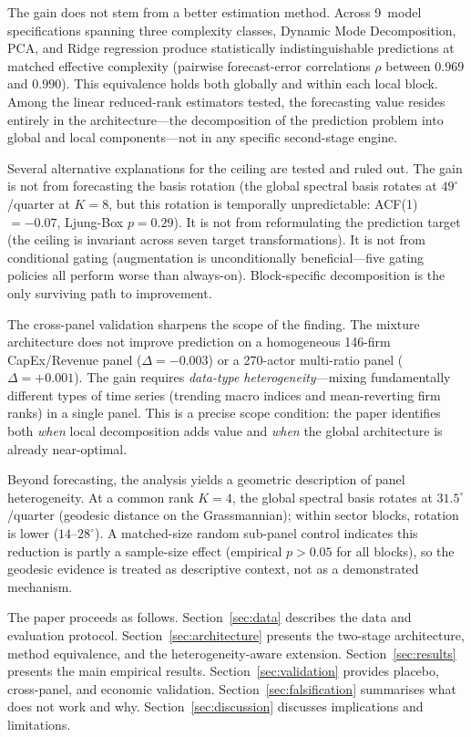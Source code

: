 \documentclass[11pt,a4paper]{article}
\begin{document}
The gain does not stem from a better estimation method. Across 9~model specifications spanning three complexity classes, Dynamic Mode Decomposition, PCA, and Ridge regression produce statistically indistinguishable predictions at matched effective complexity (pairwise forecast-error correlations $\rho$ between $0.969$ and $0.990$). This equivalence holds both globally and within each local block. Among the linear reduced-rank estimators tested, the forecasting value resides entirely in the architecture---the decomposition of the prediction problem into global and local components---not in any specific second-stage engine.

Several alternative explanations for the ceiling are tested and ruled out. The gain is not from forecasting the basis rotation (the global spectral basis rotates at $49^\circ$/quarter at $K{=}8$, but this rotation is temporally unpredictable: ACF(1) $= -0.07$, Ljung-Box $p = 0.29$). It is not from reformulating the prediction target (the ceiling is invariant across seven target transformations). It is not from conditional gating (augmentation is unconditionally beneficial---five gating policies all perform worse than always-on). Block-specific decomposition is the only surviving path to improvement.

The cross-panel validation sharpens the scope of the finding. The mixture architecture does not improve prediction on a homogeneous 146-firm CapEx/Revenue panel ($\Delta = -0.003$) or a 270-actor multi-ratio panel ($\Delta = +0.001$). The gain requires \emph{data-type heterogeneity}---mixing fundamentally different types of time series (trending macro indices and mean-reverting firm ranks) in a single panel. This is a precise scope condition: the paper identifies both \emph{when} local decomposition adds value and \emph{when} the global architecture is already near-optimal.

Beyond forecasting, the analysis yields a geometric description of panel heterogeneity. At a common rank $K{=}4$, the global spectral basis rotates at $31.5^\circ$/quarter (geodesic distance on the Grassmannian); within sector blocks, rotation is lower ($14$--$28^\circ$). A matched-size random sub-panel control indicates this reduction is partly a sample-size effect (empirical $p > 0.05$ for all blocks), so the geodesic evidence is treated as descriptive context, not as a demonstrated mechanism.

The paper proceeds as follows. Section~\ref{sec:data} describes the data and evaluation protocol. Section~\ref{sec:architecture} presents the two-stage architecture, method equivalence, and the heterogeneity-aware extension. Section~\ref{sec:results} presents the main empirical results. Section~\ref{sec:validation} provides placebo, cross-panel, and economic validation. Section~\ref{sec:falsification} summarises what does not work and why. Section~\ref{sec:discussion} discusses implications and limitations.
\end{document}
